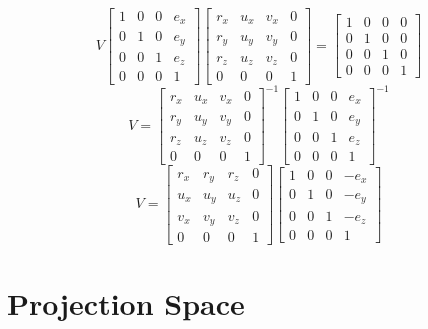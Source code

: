 \documentclass{article}
\begin{document}
\[V\begin{bmatrix}
    1 &0 &0 &e_{x} \\
    0 &1 &0 &e_{y} \\
    0 &0 &1 &e_{z} \\
    0 &0 &0 &1
\end{bmatrix}\begin{bmatrix}
    r_{x} &u_{x} &v_{x} &0 \\
    r_{y} &u_{y} &v_{y} &0 \\
    r_{z} &u_{z} &v_{z} &0 \\
    0 &0 &0 &1
\end{bmatrix}=\begin{bmatrix}
    1 &0 &0 &0 \\
    0 &1 &0 &0 \\
    0 &0 &1 &0 \\
    0 &0 &0 &1
\end{bmatrix}\]
\[V=\begin{bmatrix}
    r_{x} &u_{x} &v_{x} &0 \\
    r_{y} &u_{y} &v_{y} &0 \\
    r_{z} &u_{z} &v_{z} &0 \\
    0 &0 &0 &1
\end{bmatrix}^{-1}\begin{bmatrix}
    1 &0 &0 &e_{x} \\
    0 &1 &0 &e_{y} \\
    0 &0 &1 &e_{z} \\
    0 &0 &0 &1
\end{bmatrix}^{-1}\]
\[V=\begin{bmatrix}
    r_{x} &r_{y} &r_{z} &0 \\
    u_{x} &u_{y} &u_{z} &0 \\
    v_{x} &v_{y} &v_{z} &0 \\
    0 &0 &0 &1
\end{bmatrix}\begin{bmatrix}
    1 &0 &0 &-e_{x} \\
    0 &1 &0 &-e_{y} \\
    0 &0 &1 &-e_{z} \\
    0 &0 &0 &1
\end{bmatrix}\]

\section*{Projection Space}
\end{document}
